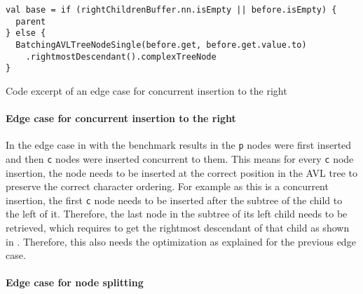 \clearpage



\begin{listing}
  \begin{verbatim}
val base = if (rightChildrenBuffer.nn.isEmpty || before.isEmpty) {
  parent
} else {
  BatchingAVLTreeNodeSingle(before.get, before.get.value.to)
    .rightmostDescendant().complexTreeNode
}
  \end{verbatim}
  \caption{Code excerpt of an edge case for concurrent insertion to the right}
  \label{lst:code-evil-insert-2}
\end{listing}

\clearpage

\paragraph{Edge case for concurrent insertion to the right}

In the edge case in  with the benchmark results in  the \texttt{p} nodes were first inserted and then \texttt{c} nodes were inserted concurrent to them. This means for every \texttt{c} node insertion, the node needs to be inserted at the correct position in the AVL tree to preserve the correct character ordering. For example as this is a concurrent insertion, the first \texttt{c} node needs to be inserted after the subtree of the child to the left of it. Therefore, the last node in the subtree of its left child needs to be retrieved, which requires to get the rightmost descendant of that child as shown in . Therefore, this also needs the optimization as explained for the previous edge case.



\clearpage

\paragraph{Edge case for node splitting} \label{subsection:evil-split}

